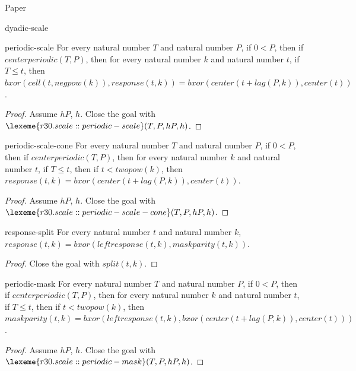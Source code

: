 \begin{lexlean}{Paper}
\begin{section}{dyadic-scale}
  \begin{theorem}{periodic-scale}
  For every natural number \(T\) and natural number \(P\), if \(0 < P\), then if \(centerperiodic(T, P)\), then for every natural number \(k\) and natural number \(t\), if \(T ≤ t\), then \(bxor(cell(t, negpow(k)), response(t, k)) = bxor(center(t + lag(P, k)), center(t))\).
  \begin{proof}
  Assume \(hP\), \(h\).
  Close the goal with \(\lexeme{r30.scale::periodic-scale}(T, P, hP, h)\).
  \end{proof}
  \end{theorem}

  \begin{theorem}{periodic-scale-cone}
  For every natural number \(T\) and natural number \(P\), if \(0 < P\), then if \(centerperiodic(T, P)\), then for every natural number \(k\) and natural number \(t\), if \(T ≤ t\), then if \(t < twopow(k)\), then \(response(t, k) = bxor(center(t + lag(P, k)), center(t))\).
  \begin{proof}
  Assume \(hP\), \(h\).
  Close the goal with \(\lexeme{r30.scale::periodic-scale-cone}(T, P, hP, h)\).
  \end{proof}
  \end{theorem}

  \begin{theorem}{response-split}
  For every natural number \(t\) and natural number \(k\), \(response(t, k) = bxor(leftresponse(t, k), maskparity(t, k))\).
  \begin{proof}
  Close the goal with \(split(t, k)\).
  \end{proof}
  \end{theorem}

  \begin{theorem}{periodic-mask}
  For every natural number \(T\) and natural number \(P\), if \(0 < P\), then if \(centerperiodic(T, P)\), then for every natural number \(k\) and natural number \(t\), if \(T ≤ t\), then if \(t < twopow(k)\), then \(maskparity(t, k) = bxor(leftresponse(t, k), bxor(center(t + lag(P, k)), center(t)))\).
  \begin{proof}
  Assume \(hP\), \(h\).
  Close the goal with \(\lexeme{r30.scale::periodic-mask}(T, P, hP, h)\).
  \end{proof}
  \end{theorem}


\end{section}
\end{lexlean}
